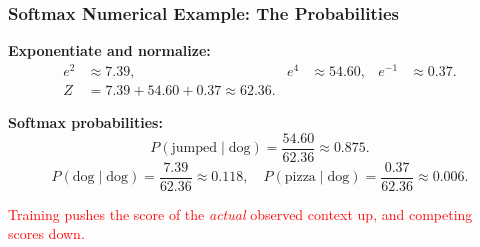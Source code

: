 \documentclass[notes,11pt, aspectratio=169]{beamer}
\newcommand{\vv}{\mathbf{v}}
\begin{document}
\begin{frame}
\frametitle{Softmax Numerical Example: The Probabilities}

\textbf{Exponentiate and normalize:}
\begin{align*}
    e^{2} &\approx 7.39, & e^{4} &\approx 54.60, & e^{-1} &\approx 0.37. \\
    Z &= 7.39 + 54.60 + 0.37 \approx 62.36.
\end{align*}

\vspace{6pt}
\textbf{Softmax probabilities:}
\[
    P(\text{jumped} \mid \text{dog}) = \frac{54.60}{62.36} \approx 0.875.
\]
\[
    P(\text{dog} \mid \text{dog}) = \frac{7.39}{62.36} \approx 0.118, \quad
    P(\text{pizza} \mid \text{dog}) = \frac{0.37}{62.36} \approx 0.006.
\]

\vspace{8pt}

\vspace{4pt}
\textcolor{red}{Training pushes the score of the \emph{actual} observed context up, and competing scores down.}
\end{frame}
\end{document}
